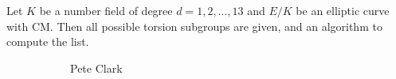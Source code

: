 \begin{frame}[plain]
	\begin{thm}
	Let $K$ be a number field of degree $d=1,2,\ldots,13$ and $E/K$ be an elliptic curve with CM. Then all possible torsion subgroups are given, and an algorithm to compute the list.
	\end{thm} 
	\begin{figure}[h]
	\centering
	\begin{subfigure}{0.23\textwidth}
	\captionsetup{labelformat=empty}
	\centering
	\caption{Pete Clark}
	\end{subfigure}
	\begin{subfigure}{0.23\textwidth}
	\captionsetup{labelformat=empty}
	\centering

\end{subfigure}
\end{figure}
\end{frame}
